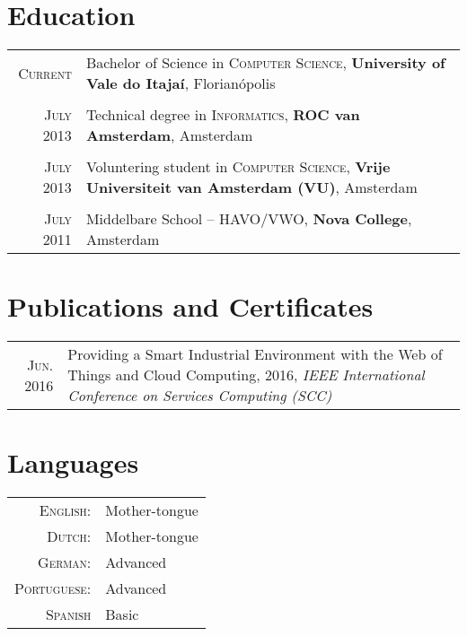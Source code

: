 \documentclass[a4paper,10pt]{article}
\begin{document}
\section{Education}
\begin{longtable}{r|p{11cm}}

\textsc{Current} & Bachelor of Science in \textsc{Computer Science}, \textbf{University of Vale do Itajaí}, Florianópolis \\ \\

\textsc{July} 2013& Technical degree in \textsc{Informatics}, \normalsize\textbf{ROC van Amsterdam}, Amsterdam \\ \\

\textsc{July} 2013& Voluntering student in \textsc{Computer Science}, \normalsize\textbf{Vrije Universiteit van Amsterdam (VU)}, Amsterdam \\ \\

\textsc{July} 2011 & Middelbare School – HAVO/VWO, \normalsize\textbf{Nova College}, Amsterdam \\

\end{longtable}

\section{Publications and Certificates}
\begin{tabular}{r|p{11cm}}

\textsc{Jun.} 2016 & Providing a Smart Industrial Environment with the Web of Things and Cloud Computing, 2016, \textit{IEEE International Conference on Services Computing (SCC)}\normalsize\\

\end{tabular}

\section{Languages}
\begin{tabular}{rp{12cm}}
\textsc{English:} & Mother-tongue \\
\textsc{Dutch:} & Mother-tongue \\
\textsc{German:} & Advanced \\
\textsc{Portuguese:} & Advanced \\
\textsc{Spanish} & Basic
\end{tabular}
\end{document}
